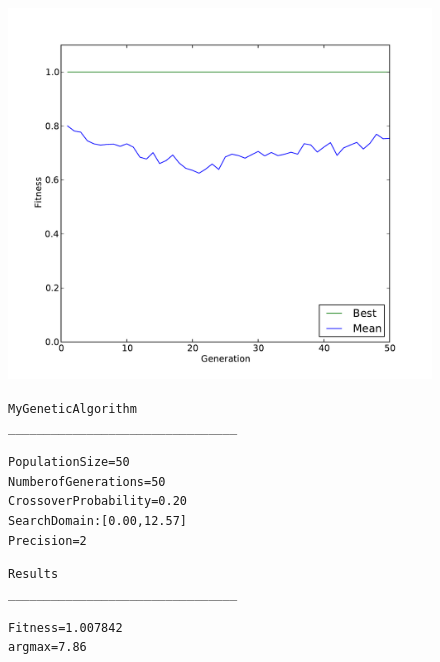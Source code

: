 \documentclass{article}
\begin{document}
\begin{figure}
        \begin{center}
                \begin{minipage}[h!]{0.7\textwidth}
                        \includegraphics[width=\textwidth]{gaConvergeMe.pdf}
                \end{minipage}
                \begin{minipage}[h!]{0.29\textwidth}
                        \begin{alltt}
			      My Genetic Algorithm
			________________________________
			
			Population Size       = 50
			Number of Generations = 50
			Crossover Probability = 0.20
			Search Domain: [0.00, 12.57]
			Precision             = 2
			
			            Results  
			________________________________
			
			Fitness               = 1.007842
			argmax                = 7.86
                        \end{alltt}
                \end{minipage}
        \end{center}
\end{figure}

\clearpage
\end{document}
